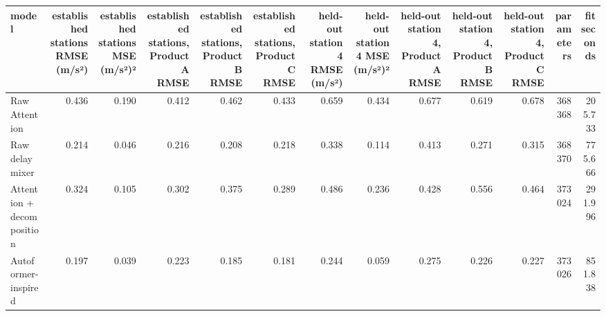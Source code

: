 \begin{tabular}{lrrrrrrrrrrrr}
\toprule
model & established stations RMSE (m/s²) & established stations MSE (m/s²)² & established stations, Product A RMSE & established stations, Product B RMSE & established stations, Product C RMSE & held-out station 4 RMSE (m/s²) & held-out station 4 MSE (m/s²)² & held-out station 4, Product A RMSE & held-out station 4, Product B RMSE & held-out station 4, Product C RMSE & parameters & fit seconds \\
\midrule
Raw Attention & 0.436 & 0.190 & 0.412 & 0.462 & 0.433 & 0.659 & 0.434 & 0.677 & 0.619 & 0.678 & 368368 & 205.733 \\
Raw delay mixer & 0.214 & 0.046 & 0.216 & 0.208 & 0.218 & 0.338 & 0.114 & 0.413 & 0.271 & 0.315 & 368370 & 775.666 \\
Attention + decomposition & 0.324 & 0.105 & 0.302 & 0.375 & 0.289 & 0.486 & 0.236 & 0.428 & 0.556 & 0.464 & 373024 & 291.996 \\
Autoformer-inspired & 0.197 & 0.039 & 0.223 & 0.185 & 0.181 & 0.244 & 0.059 & 0.275 & 0.226 & 0.227 & 373026 & 851.838 \\
\bottomrule
\end{tabular}
